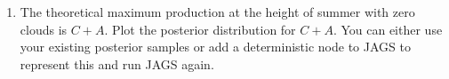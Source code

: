 \documentclass[12pt]{article}
\begin{document}
\begin{Questions}
\begin{enumerate}
\item [(f)] The theoretical maximum production at the height of summer
with zero clouds is $C + A$. Plot the posterior distribution for $C + A$.
You can either use your existing posterior samples or add a deterministic
node to JAGS to represent this and run JAGS again.

\end{enumerate}



\end{Questions}
\end{document}
